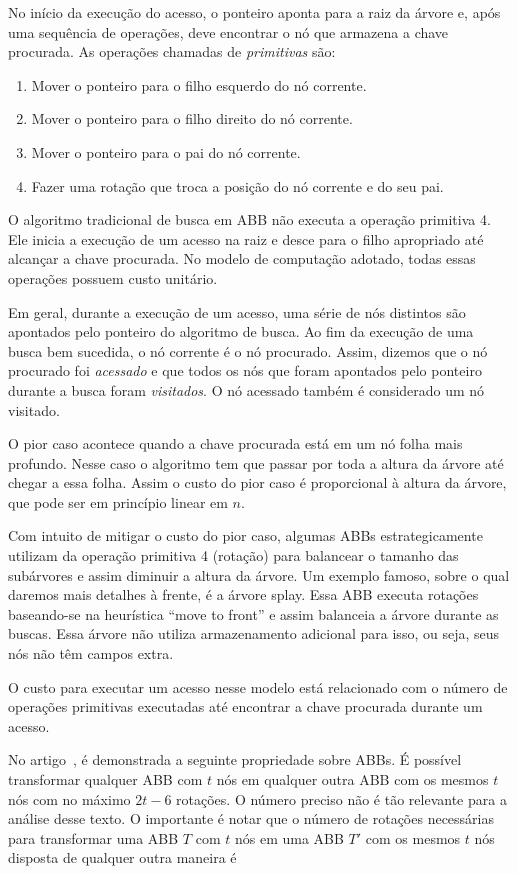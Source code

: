 No início da execução do acesso, o ponteiro aponta para a raiz da árvore e, após uma sequência de operações, deve encontrar o nó que armazena a chave procurada. As operações chamadas de \textit{primitivas} são:
\begin{enumerate}
    \item Mover o ponteiro para o filho esquerdo do nó corrente.
    \item Mover o ponteiro para o filho direito do nó corrente.
    \item Mover o ponteiro para o pai do nó corrente.
    \item Fazer uma rotação que troca a posição do nó corrente e do seu pai.
\end{enumerate}

O algoritmo tradicional de busca em ABB não executa a operação primitiva 4. Ele inicia a execução de um acesso na raiz e desce para o filho apropriado até alcançar a chave procurada. No modelo de computação adotado, todas essas operações possuem custo unitário.

Em geral, durante a execução de um acesso, uma série de nós distintos são apontados pelo ponteiro do algoritmo de busca. Ao fim da execução de uma busca bem sucedida, o nó corrente é o nó procurado. Assim, dizemos que o nó procurado foi \textit{acessado} e que todos os nós que foram apontados pelo ponteiro durante a busca foram \textit{visitados}. O nó acessado também é considerado um nó visitado.

O pior caso acontece quando a chave procurada está em um nó folha mais profundo. Nesse caso o algoritmo tem que passar por toda a altura da árvore até chegar a essa folha. Assim o custo do pior caso é proporcional à altura da árvore, que pode ser em princípio linear em $n$.

Com intuito de mitigar o custo do pior caso, algumas ABBs estrategicamente utilizam da operação primitiva 4 (rotação) para balancear o tamanho das subárvores e assim diminuir a altura da árvore. Um exemplo famoso, sobre o qual daremos mais detalhes à frente, é a árvore splay. Essa ABB executa rotações baseando-se na heurística ``move to front'' e assim balanceia a árvore durante as buscas. Essa árvore não utiliza armazenamento adicional para isso, ou seja, seus nós não têm campos extra.

O custo para executar um acesso nesse modelo está relacionado com o número de operações primitivas executadas até encontrar a chave procurada durante um acesso. 

No artigo~\cite{rotation_distance}, é demonstrada a seguinte propriedade sobre ABBs. É possível transformar qualquer ABB com $t$ nós em qualquer outra ABB com os mesmos $t$ nós com no máximo $2t - 6$ rotações. O número preciso não é tão relevante para a análise desse texto. O importante é notar que o número de rotações necessárias para transformar uma ABB $T$ com $t$ nós em uma ABB $T'$ com os mesmos $t$ nós disposta de qualquer outra maneira é %

